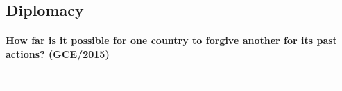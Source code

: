 \documentclass[../../main]{subfiles}
\begin{document}
\subsection{Diplomacy}

\paragraph{How far is it possible for one country to forgive another for its past actions? (GCE/2015)} \_
\end{document}
